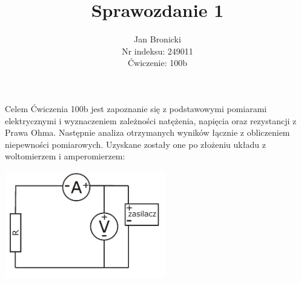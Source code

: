 \documentclass{article}
\title{Sprawozdanie 1}
\author{Jan Bronicki \\
Nr indeksu: 249011\\
Ćwiczenie: 100b}
\date{}
\begin{document}
\maketitle

%
\begin{flushleft}
    Celem Ćwiczenia 100b jest zapoznanie się z podstawowymi 
pomiarami elektrycznymi i wyznaczeniem zależności natężenia,
napięcia oraz rezystancji z Prawa Ohma.
Następnie analiza otrzymanych wyników łącznie z obliczeniem
niepewności pomiarowych. Uzyskane zostały one po złożeniu 
układu z woltomierzem i amperomierzem: 
\end{flushleft}
\begin{center}
    \includegraphics[width=7cm]{graph1.png} 
\end{center}
\end{document}
